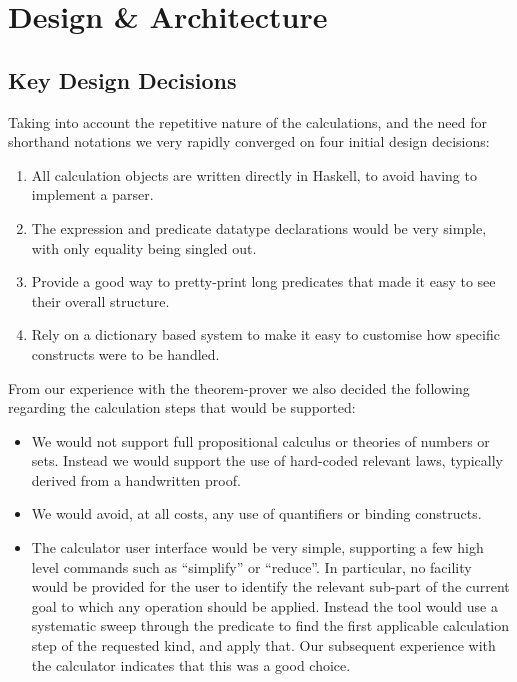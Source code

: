 \section{Design \& Architecture}\label{sec:Design}

\subsection{Key Design Decisions}

Taking into account the repetitive nature of the calculations,
and the need for shorthand notations we very rapidly converged
on four initial design decisions:
\begin{enumerate}
  \item All calculation objects are written
  directly in Haskell, to avoid having to implement a parser.
  \item The expression and predicate datatype declarations
   would be very simple, with only equality being singled out.
  \item Provide a good way to pretty-print long predicates
    that made it easy to see their overall structure.
  \item Rely on a dictionary based system to
    make it easy to customise how specific constructs
    were to be handled.
\end{enumerate}
From our experience with the  theorem-prover we also decided
the following regarding the calculation steps that would be supported:
\begin{itemize}
  \item
    We would not support full  propositional calculus
    or theories of numbers or sets.
    Instead we would support the use of hard-coded relevant laws,
    typically derived from a handwritten proof.
  \item
    We would avoid, at all costs,
    any use of quantifiers or binding constructs.
  \item
    The calculator user interface would be very simple,
    supporting a few high level commands such as ``simplify''
    or ``reduce''.
    In particular,
    no facility would be provided for the user to identify
    the relevant sub-part of the current goal to which any operation
    should be applied.
    Instead the tool would use a systematic sweep through the predicate
    to find the first applicable calculation step of the requested kind,
    and apply that.
    Our subsequent experience with the calculator indicates
    that this was a good choice.
\end{itemize}


